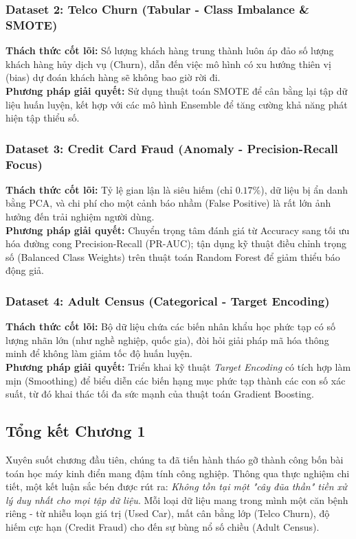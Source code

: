 \subsubsection{Dataset 2: Telco Churn (Tabular - Class Imbalance \& SMOTE)}
\textbf{Thách thức cốt lõi:} Số lượng khách hàng trung thành luôn áp đảo số lượng khách hàng hủy dịch vụ (Churn), dẫn đến việc mô hình có xu hướng thiên vị (bias) dự đoán khách hàng sẽ không bao giờ rời đi. \\
\textbf{Phương pháp giải quyết:} Sử dụng thuật toán SMOTE để cân bằng lại tập dữ liệu huấn luyện, kết hợp với các mô hình Ensemble để tăng cường khả năng phát hiện tập thiểu số.


\subsubsection{Dataset 3: Credit Card Fraud (Anomaly - Precision-Recall Focus)}
\textbf{Thách thức cốt lõi:} Tỷ lệ gian lận là siêu hiếm (chỉ $0.17\%$), dữ liệu bị ẩn danh bằng PCA, và chi phí cho một cảnh báo nhầm (False Positive) là rất lớn ảnh hưởng đến trải nghiệm người dùng. \\
\textbf{Phương pháp giải quyết:} Chuyển trọng tâm đánh giá từ Accuracy sang tối ưu hóa đường cong Precision-Recall (PR-AUC); tận dụng kỹ thuật điều chỉnh trọng số (Balanced Class Weights) trên thuật toán Random Forest để giảm thiểu báo động giả.


\subsubsection{Dataset 4: Adult Census (Categorical - Target Encoding)}
\textbf{Thách thức cốt lõi:} Bộ dữ liệu chứa các biến nhân khẩu học phức tạp có số lượng nhãn lớn (như nghề nghiệp, quốc gia), đòi hỏi giải pháp mã hóa thông minh để không làm giảm tốc độ huấn luyện. \\
\textbf{Phương pháp giải quyết:} Triển khai kỹ thuật \textit{Target Encoding} có tích hợp làm mịn (Smoothing) để biểu diễn các biến hạng mục phức tạp thành các con số xác suất, từ đó khai thác tối đa sức mạnh của thuật toán Gradient Boosting.


\subsection{Tổng kết Chương 1}
Xuyên suốt chương đầu tiên, chúng ta đã tiến hành tháo gỡ thành công bốn bài toán học máy kinh điển mang đậm tính công nghiệp. Thông qua thực nghiệm chi tiết, một kết luận sắc bén được rút ra: \textit{Không tồn tại một "cây đũa thần" tiền xử lý duy nhất cho mọi tập dữ liệu}. Mỗi loại dữ liệu mang trong mình một căn bệnh riêng - từ nhiễu loạn giá trị (Used Car), mất cân bằng lớp (Telco Churn), độ hiếm cực hạn (Credit Fraud) cho đến sự bùng nổ số chiều (Adult Census). 

